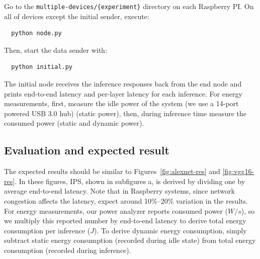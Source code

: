 \documentclass[sigplan]{acmart}
\begin{document}
  Go to the \texttt{multiple-devices/\{experiment\}} directory on each Raspberry PI. On all of devices except the initial sender, execute:
\begin{lstlisting}
  python node.py
\end{lstlisting}
Then, start the data sender with:
\begin{lstlisting}
  python initial.py
\end{lstlisting}
The initial node receives the inference responses back from the end node and prints end-to-end latency and per-layer latency for each inference. For energy measurements, first, measure the idle power of the system (we use a 14-port powered USB 3.0 hub) (static power), then, during inference time measure the consumed power (static and dynamic power).

\subsection{Evaluation and expected result}

The expected results should be similar to Figures~\ref{fig:alexnet-res} and \ref{fig:vgg16-res}. In these figures, IPS, shown in subfigures a, is derived by dividing one by average end-to-end latency. Note that in Raspberry systems, since network congestion affects the latency, expect around 10\%--20\% variation in the results. For energy measurements, our power analyzer reports consumed power ($W/s$), so we multiply this reported number by end-to-end latency to derive total energy consumption per inference ($J$). To derive dynamic energy consumption, simply subtract static energy consumption (recorded during idle state) from total energy consumption (recorded during inference).



\end{document}
